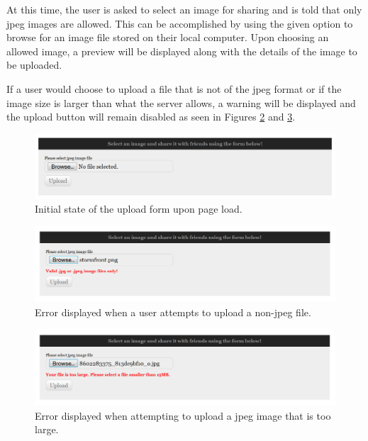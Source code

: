 At this time, the user is asked to select an image for sharing and is told that only jpeg images are allowed. This can be accomplished by using the given option to browse for an image file stored on their local computer. Upon choosing an allowed image, a preview will be displayed along with the details of the image to be uploaded.

If a user would choose to upload a file that is not of the jpeg format or if the image size is larger than what the server allows, a warning will be displayed and the upload button will remain disabled as seen in Figures \ref{fig:typewarning} and \ref{fig:sizewarning}.

\begin{figure}[htbp]
\centering
\includegraphics[width=6in]{uploadform}
\caption{Initial state of the upload form upon page load.}
\label{fig:shareprompt}
\end{figure}

\begin{figure}[htbp]
\centering
\includegraphics[width=6in]{typewarning}
\caption{Error displayed when a user attempts to upload a non-jpeg file.}
\label{fig:typewarning}
\end{figure}

\begin{figure}[htbp]
\centering
\includegraphics[width=6in]{sizewarning}
\caption{Error displayed when attempting to upload a jpeg image that is too large.}
\label{fig:sizewarning}
\end{figure}

